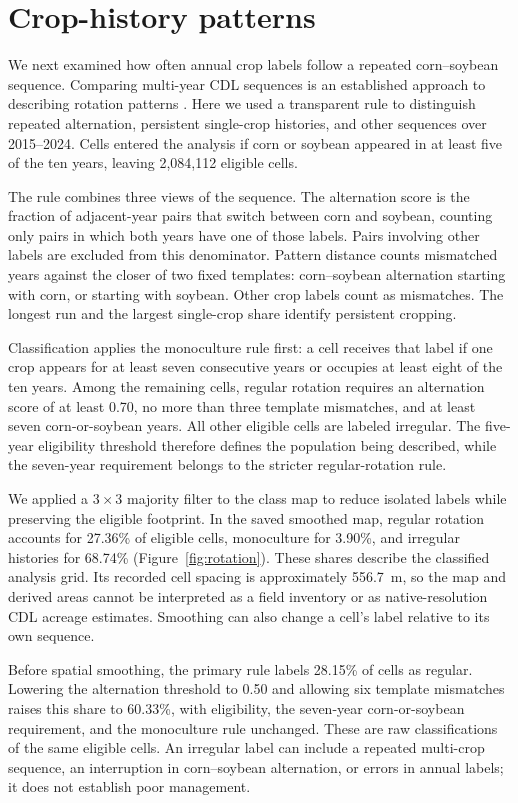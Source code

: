 \phenologyfigure

\section{Crop-history patterns}
\label{sec:rotation}

We next examined how often annual crop labels follow a repeated corn--soybean sequence. Comparing multi-year CDL sequences is an established approach to describing rotation patterns \citep{sahajpal2014recruit}. Here we used a transparent rule to distinguish repeated alternation, persistent single-crop histories, and other sequences over 2015--2024. Cells entered the analysis if corn or soybean appeared in at least five of the ten years, leaving 2,084,112 eligible cells.

The rule combines three views of the sequence. The alternation score is the fraction of adjacent-year pairs that switch between corn and soybean, counting only pairs in which both years have one of those labels. Pairs involving other labels are excluded from this denominator. Pattern distance counts mismatched years against the closer of two fixed templates: corn--soybean alternation starting with corn, or starting with soybean. Other crop labels count as mismatches. The longest run and the largest single-crop share identify persistent cropping.

Classification applies the monoculture rule first: a cell receives that label if one crop appears for at least seven consecutive years or occupies at least eight of the ten years. Among the remaining cells, regular rotation requires an alternation score of at least 0.70, no more than three template mismatches, and at least seven corn-or-soybean years. All other eligible cells are labeled irregular. The five-year eligibility threshold therefore defines the population being described, while the seven-year requirement belongs to the stricter regular-rotation rule.

We applied a $3\times3$ majority filter to the class map to reduce isolated labels while preserving the eligible footprint. In the saved smoothed map, regular rotation accounts for 27.36\% of eligible cells, monoculture for 3.90\%, and irregular histories for 68.74\% (Figure~\ref{fig:rotation}). These shares describe the classified analysis grid. Its recorded cell spacing is approximately 556.7~m, so the map and derived areas cannot be interpreted as a field inventory or as native-resolution CDL acreage estimates. Smoothing can also change a cell's label relative to its own sequence.

Before spatial smoothing, the primary rule labels 28.15\% of cells as regular. Lowering the alternation threshold to 0.50 and allowing six template mismatches raises this share to 60.33\%, with eligibility, the seven-year corn-or-soybean requirement, and the monoculture rule unchanged. These are raw classifications of the same eligible cells. An irregular label can include a repeated multi-crop sequence, an interruption in corn--soybean alternation, or errors in annual labels; it does not establish poor management.

\rotationfigure
